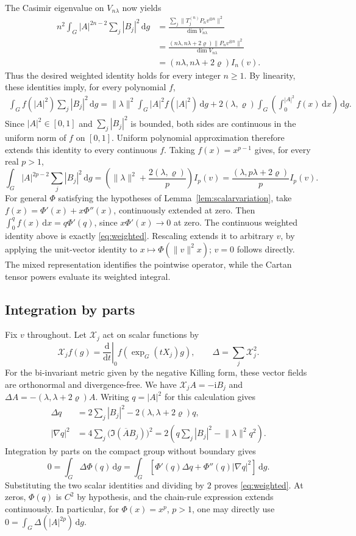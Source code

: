 \documentclass[11pt,reqno]{amsart}
\numberwithin{equation}{section}
\theoremstyle{plain}
\theoremstyle{remark}
\newcommand{\rh}{\varrho}
\newcommand{\ii}{\mathrm i}
\newcommand{\dd}{\,\mathrm d}
\newcommand{\norm}[1]{\lVert#1\rVert}
\begin{document}
The Casimir eigenvalue on $V_{n\lambda}$ now yields
\begin{align*}
 n^2\int_G|A|^{2n-2}\sum_j|B_j|^2\dd g
 &=\frac{\sum_j\norm{T_j^{(n)}P_nv^{\otimes n}}^2}
         {\dim V_{n\lambda}}\\
 &=\frac{(n\lambda,n\lambda+2\rh)\norm{P_nv^{\otimes n}}^2}
         {\dim V_{n\lambda}}\\
 &=(n\lambda,n\lambda+2\rh)I_n(v).
\end{align*}
Thus the desired weighted identity holds for every integer $n\ge1$.
By linearity, these identities imply, for every polynomial $f$,
\begin{align*}
 \int_G f(|A|^2)\sum_j|B_j|^2\dd g
 =\norm{\lambda}^2\int_G|A|^2f(|A|^2)\dd g+2(\lambda,\rh)
       \int_G\left(\int_0^{|A|^2}f(x)\,\mathrm dx\right)\dd g.
\end{align*}
Since $|A|^2\in[0,1]$ and $\sum_j|B_j|^2$ is bounded, both sides
are continuous in the uniform norm of $f$ on $[0,1]$.
Uniform polynomial approximation therefore extends this identity to
every continuous $f$. Taking $f(x)=x^{p-1}$ gives, for every real $p>1$,
\[
 \int_G|A|^{2p-2}\sum_j|B_j|^2\dd g
 =\left(\norm{\lambda}^2+\frac{2(\lambda,\rh)}p\right)I_p(v)
 =\frac{(\lambda,p\lambda+2\rh)}p I_p(v).
\]
For general $\Phi$ satisfying the hypotheses of Lemma~\ref{lem:scalarvariation}, take
$f(x)=\Phi'(x)+x\Phi''(x)$, continuously extended at zero.
Then $\int_0^q f(x)\,\mathrm dx=q\Phi'(q)$, since
$x\Phi'(x)\to0$ at zero. The continuous weighted identity above
is exactly \eqref{eq:weighted}. Rescaling extends it to arbitrary $v$,
by applying the unit-vector identity to $x\mapsto\Phi(\norm v^2x)$;
$v=0$ follows directly. The mixed representation identifies the
pointwise operator, while the Cartan tensor powers evaluate its weighted integral.

\subsection{Integration by parts}
Fix $v$ throughout. Let $\mathcal X_j$ act on scalar functions by
\[
 \mathcal X_j f(g)=\left.\frac{\mathrm d}{\mathrm dt}\right|_0
                         f(\exp_G(tX_j)g),\qquad
 \Delta=\sum_j\mathcal X_j^2.
\]
For the bi-invariant metric given by the negative Killing form,
these vector fields are orthonormal and divergence-free. We have
$\mathcal X_j A=-\ii B_j$ and
$\Delta A=-(\lambda,\lambda+2\rh)A$.
Writing $q=|A|^2$ for this calculation gives
\begin{align*}
 \Delta q&=2\sum_j|B_j|^2-2(\lambda,\lambda+2\rh)q,\\
 |\nabla q|^2&=4\sum_j\bigl(\Im(\overline A B_j)\bigr)^2
       =2\left(q\sum_j|B_j|^2-\norm{\lambda}^2q^2\right).
\end{align*}
Integration by parts on the compact group without boundary gives
\[
 0=\int_G\Delta\Phi(q)\dd g
   =\int_G\left[\Phi'(q)\Delta q+\Phi''(q)|\nabla q|^2\right]\dd g.
\]
Substituting the two scalar identities and dividing by $2$ proves
\eqref{eq:weighted}. At zeros, $\Phi(q)$ is $C^2$ by hypothesis,
and the chain-rule expression extends continuously. In particular,
for $\Phi(x)=x^p$, $p>1$, one may directly use
$0=\int_G\Delta(|A|^{2p})\dd g$.
\end{document}
